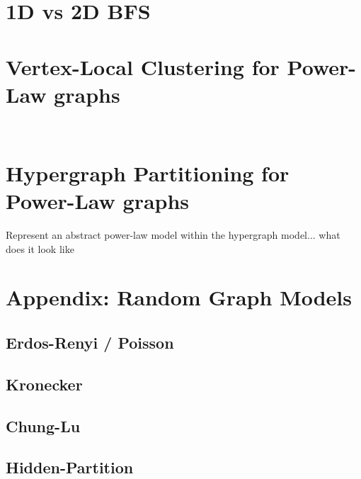 \documentclass[11pt]{article}
\begin{document}
\section{1D vs 2D BFS}
\cite{Buluc:2011:PBS:2063384.2063471}

\section{Vertex-Local Clustering for Power-Law graphs}
\cite{Andersen:2009:FSC:1536414.1536449}




\begin{verbatim}

\end{verbatim}

\begin{verbatim}

\end{verbatim}

\section{Hypergraph Partitioning for Power-Law graphs}
Represent an abstract power-law model within the hypergraph model... what does it look like

\section{Appendix: Random Graph Models}
\subsection{Erdos-Renyi / Poisson}

\subsection{Kronecker}
\cite{leskovec2007scalable}

\subsection{Chung-Lu}
\cite{chung2004average}

\subsection{Hidden-Partition}
\cite{Condon99algorithmsfor}
\end{document}
